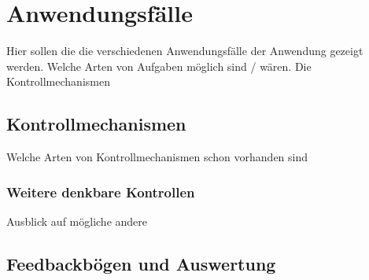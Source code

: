 \chapter{Anwendungsfälle} \label{Anwendungsfälle}
Hier sollen die die verschiedenen Anwendungsfälle der Anwendung gezeigt werden.
Welche Arten von Aufgaben möglich sind / wären.
Die Kontrollmechanismen

\section{Kontrollmechanismen}
Welche Arten von Kontrollmechanismen schon vorhanden sind
\subsection{Weitere denkbare Kontrollen}
Ausblick auf mögliche andere
\section{Feedbackbögen und Auswertung}
